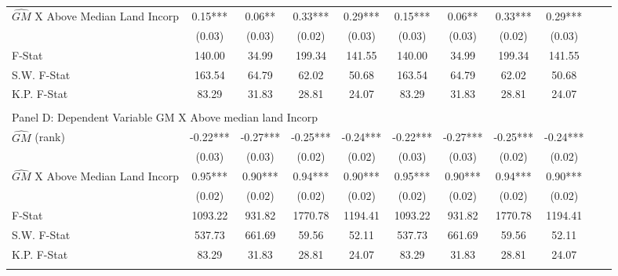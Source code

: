 \begin{table}[htbp]
\begin{threeparttable}
\begin{tabular}{l*{10}{c}}
\addlinespace
$\hat{GM}$ X Above Median Land Incorp&       0.15***&       0.06** &       0.33***&       0.29***&       0.15***&       0.06** &       0.33***&       0.29***\\
                &     (0.03)   &     (0.03)   &     (0.02)   &     (0.03)   &     (0.03)   &     (0.03)   &     (0.02)   &     (0.03)   \\
\midrule
F-Stat          &     140.00   &      34.99   &     199.34   &     141.55   &     140.00   &      34.99   &     199.34   &     141.55   \\
S.W. F-Stat     &     163.54   &      64.79   &      62.02   &      50.68   &     163.54   &      64.79   &      62.02   &      50.68   \\
K.P. F-Stat     &      83.29   &      31.83   &      28.81   &      24.07   &      83.29   &      31.83   &      28.81   &      24.07   \\
\cmidrule[\heavyrulewidth](lr){1-9} \\ \cmidrule[\heavyrulewidth](lr){1-9}
\multicolumn{8}{l}{Panel D: Dependent Variable GM X Above median land Incorp}\\
\cmidrule(lr){1-9}
$\hat{GM}$ (rank)&      -0.22***&      -0.27***&      -0.25***&      -0.24***&      -0.22***&      -0.27***&      -0.25***&      -0.24***\\
                &     (0.03)   &     (0.03)   &     (0.02)   &     (0.02)   &     (0.03)   &     (0.03)   &     (0.02)   &     (0.02)   \\
\addlinespace
$\hat{GM}$ X Above Median Land Incorp&       0.95***&       0.90***&       0.94***&       0.90***&       0.95***&       0.90***&       0.94***&       0.90***\\
                &     (0.02)   &     (0.02)   &     (0.02)   &     (0.02)   &     (0.02)   &     (0.02)   &     (0.02)   &     (0.02)   \\
\midrule
F-Stat          &    1093.22   &     931.82   &    1770.78   &    1194.41   &    1093.22   &     931.82   &    1770.78   &    1194.41   \\
S.W. F-Stat     &     537.73   &     661.69   &      59.56   &      52.11   &     537.73   &     661.69   &      59.56   &      52.11   \\
K.P. F-Stat     &      83.29   &      31.83   &      28.81   &      24.07   &      83.29   &      31.83   &      28.81   &      24.07   \\
\cmidrule[\heavyrulewidth](lr){1-9} \\ \cmidrule[\heavyrulewidth](lr){1-9}

\end{tabular}
\end{threeparttable}
\end{table}
